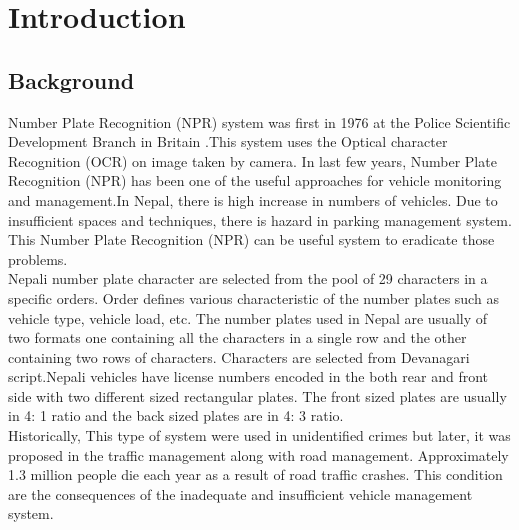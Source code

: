 \chapter{Introduction}
\section{Background}
Number Plate Recognition (NPR) system was first in  1976 at the Police Scientific Development Branch in Britain\cite{anpr_wikipedia} .This system uses the Optical character Recognition (OCR) on image taken by camera.
In last few years, Number Plate Recognition (NPR) has been one of the useful approaches for vehicle monitoring and management.In Nepal, there is high increase in numbers of vehicles. Due to insufficient spaces and techniques, there is hazard in parking management system. This Number Plate Recognition (NPR) can be useful system to eradicate those problems.\\
Nepali number plate character are selected from the pool of 29 characters in a speciﬁc orders. Order deﬁnes various characteristic of the number plates such as vehicle type, vehicle load, etc. The number plates used in Nepal are usually of two formats one containing all the characters in a single row and the other containing two rows of characters. Characters are selected from Devanagari script.Nepali vehicles have license numbers encoded in the both rear and front side with two different sized rectangular plates. The front sized plates are usually in 4: 1 ratio and the back sized plates are in 4: 3 ratio.\cite{pandey_2020}\\
Historically, This type of system were used in unidentified crimes but later, it was proposed in the traffic management along with road management. Approximately 1.3 million people die each year as a result of road traffic crashes.\cite{world_health_organization} This condition are the consequences of the inadequate and insufficient vehicle management system.   

